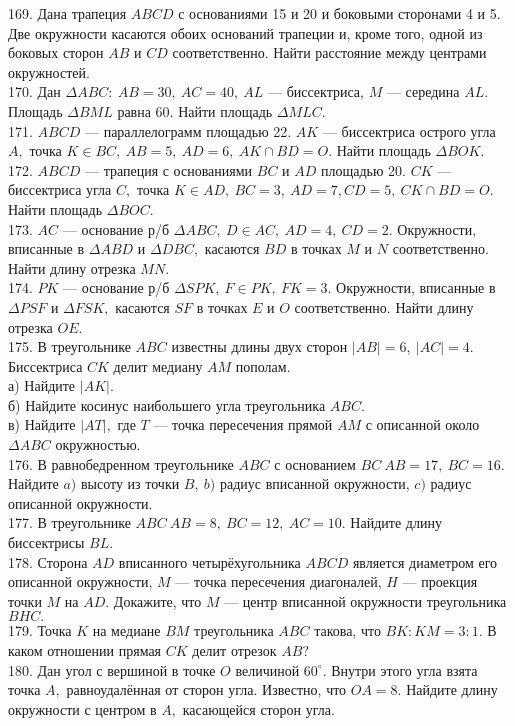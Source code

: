 169. Дана трапеция $ABCD$ с основаниями 15 и 20 и боковыми сторонами 4 и 5. Две окружности касаются обоих оснований трапеции и, кроме того, одной из боковых сторон $AB$ и $CD$ соответственно. Найти расстояние между центрами окружностей.\\
170. Дан $\Delta ABC:\ AB=30,\ AC=40,\ AL$ --- биссектриса, $M$ --- середина $AL.$ Площадь $\Delta BML$ равна 60. Найти площадь $\Delta MLC.$\\
171. $ABCD$ --- параллелограмм площадью 22. $AK$ --- биссектриса острого угла $A,$ точка $K\in BC,\ AB=5,\ AD=6,\ AK\cap BD=O.$ Найти площадь $\Delta BOK.$\\
172. $ABCD$ --- трапеция с основаниями $BC$ и $AD$ площадью 20. $CK$ --- биссектриса угла $C,$ точка $K\in AD,\ BC=3,\ AD=7, CD=5,\ CK\cap BD=O.$ Найти площадь $\Delta BOC.$\\
173. $AC$ --- основание р/б $\Delta ABC,\ D\in AC,\ AD=4,\ CD=2.$ Окружности, вписанные в $\Delta ABD$ и $\Delta DBC,$ касаются $BD$ в точках $M$ и $N$ соответственно. Найти длину отрезка $MN.$\\
174. $PK$ --- основание р/б $\Delta SPK,\ F\in PK,\ FK=3.$ Окружности, вписанные в $\Delta PSF$ и $\Delta FSK,$ касаются $SF$ в точках $E$ и $O$ соответственно. Найти длину отрезка $OE.$\\
175. В треугольнике $ABC$ известны длины двух сторон $|AB|=6,\ |AC|=4.$ Биссектриса $CK$ делит медиану $AM$ пополам.\\
а) Найдите $|AK|.$\\
б) Найдите косинус наибольшего угла треугольника $ABC.$\\
в) Найдите $|AT|,$ где $T$ --- точка пересечения прямой $AM$ с описанной около $\Delta ABC$ окружностью.\\
176. В равнобедренном треугольнике $ABC$ с основанием $BC\ AB=17,\ BC=16.$ Найдите $a)$ высоту из точки $B,\ b)$ радиус вписанной окружности, $c)$ радиус описанной окружности.\\
177. В треугольнике $ABC\ AB=8,\ BC=12,\ AC=10.$ Найдите длину биссектрисы $BL.$\\
178. Сторона $AD$ вписанного четырёхугольника $ABCD$ является диаметром его описанной окружности, $M$ --- точка пересечения диагоналей, $H$ --- проекция точки $M$ на $AD.$ Докажите, что $M$ --- центр вписанной окружности треугольника $BHC.$\\
179. Точка $K$ на медиане $BM$ треугольника $ABC$ такова, что $BK:KM=3:1.$ В каком отношении прямая $CK$ делит отрезок $AB?$\\
180. Дан угол с вершиной в точке $O$ величиной $60^\circ.$ Внутри этого угла взята точка $A,$ равноудалённая от сторон угла. Известно, что $OA=8.$ Найдите длину окружности с центром в $A,$ касающейся сторон угла.\\
